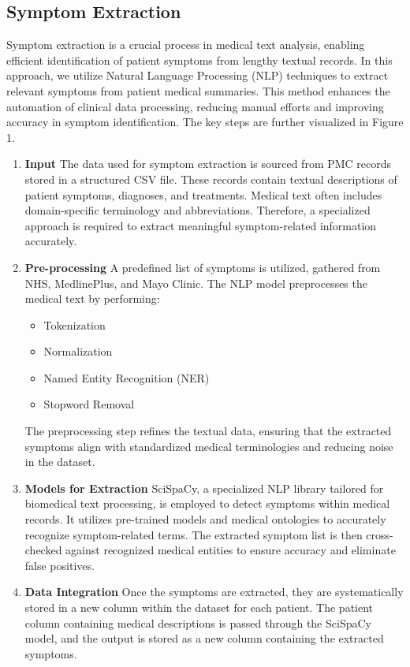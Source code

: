 \subsection{Symptom Extraction}
Symptom extraction is a crucial process in medical text analysis, enabling efficient identification of patient symptoms from lengthy textual records. In this approach, we utilize Natural Language Processing (NLP) techniques to extract relevant symptoms from patient medical summaries. This method enhances the automation of clinical data processing, reducing manual efforts and improving accuracy in symptom identification. The key steps are further visualized in Figure 1. 

\begin{enumerate}
    \item \textbf{Input}
    The data used for symptom extraction is sourced from PMC records stored in a structured CSV file. These records contain textual descriptions of patient symptoms, diagnoses, and treatments. Medical text often includes domain-specific terminology and abbreviations. Therefore, a specialized approach is required to extract meaningful symptom-related information accurately. 

    \item \textbf{Pre-processing}
    A predefined list of symptoms is utilized, gathered from NHS, MedlinePlus, and Mayo Clinic. The NLP model preprocesses the medical text by performing:
    \begin{itemize}
        \item Tokenization
        \item Normalization
        \item Named Entity Recognition (NER)
        \item Stopword Removal
    \end{itemize}
    The preprocessing step refines the textual data, ensuring that the extracted symptoms align with standardized medical terminologies and reducing noise in the dataset.

    \item \textbf{Models for Extraction} 
    SciSpaCy, a specialized NLP library tailored for biomedical text processing, is employed to detect symptoms within medical records. It utilizes pre-trained models and medical ontologies to accurately recognize symptom-related terms. The extracted symptom list is then cross-checked against recognized medical entities to ensure accuracy and eliminate false positives.

    \item \textbf{Data Integration} 
    Once the symptoms are extracted, they are systematically stored in a new column within the dataset for each patient. The patient column containing medical descriptions is passed through the SciSpaCy model, and the output is stored as a new column containing the extracted symptoms.
\end{enumerate}

